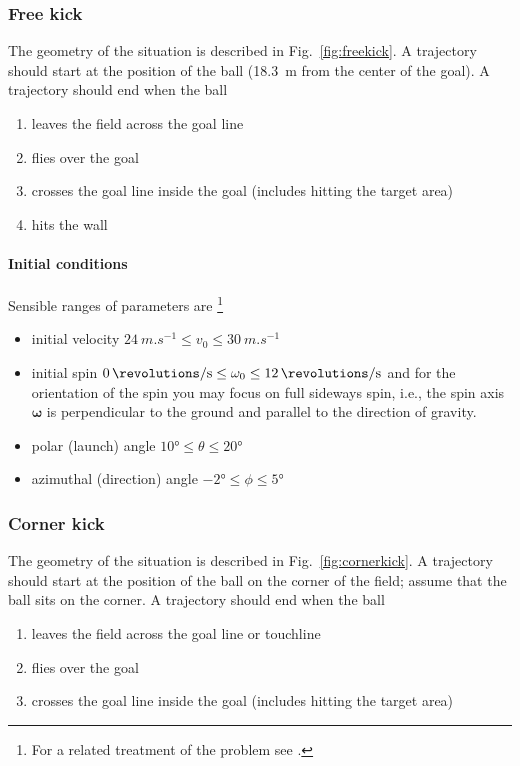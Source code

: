 \documentclass[letterpaper]{scrartcl}
\begin{document}
\subsubsection{Free kick}
\label{sec:freekick}

The geometry of the situation is described in
Fig.~\ref{fig:freekick}. A trajectory should start at the position of
the ball (\SI{18.3}{m} from the center of the goal). A trajectory
should end when the ball
\begin{enumerate}
\item leaves the field across the goal line
\item flies over the goal
\item crosses the goal line inside the goal (includes hitting the
  target area)
\item hits the wall
\end{enumerate}


\paragraph{Initial conditions}

Sensible ranges of parameters are \citep{Cook:2006aa}\footnote{For a
  related treatment of the problem see \citet{Bray:2003aa}.}
\begin{itemize}
\item initial velocity $\SI{24}{m.s^{-1}} \le v_{0} \le \SI{30}{m.s^{-1}}$
\item initial spin
  $\SI{0}{\revolutions\per\second} \le \omega_{0} \le
  \SI{12}{\revolutions\per\second}$ and for the orientation of the
  spin you may focus on full sideways spin, i.e., the spin axis
  $\boldsymbol{\omega}$ is perpendicular to the ground and parallel to
  the direction of gravity.
\item polar (launch) angle $\ang{10} \le \theta \le \ang{20}$
\item azimuthal (direction) angle $\ang{-2} \le \phi \le \ang{5}$
\end{itemize}

\subsubsection{Corner kick}
\label{sec:cornerkick}

The geometry of the situation is described in
Fig.~\ref{fig:cornerkick}. A trajectory should start at the position
of the ball on the corner of the field; assume that the ball sits on
the corner. A trajectory should end when the ball
\begin{enumerate}
\item leaves the field across the goal line or touchline
\item flies over the goal
\item crosses the goal line inside the goal (includes hitting the
  target area)
\end{enumerate}
\end{document}
